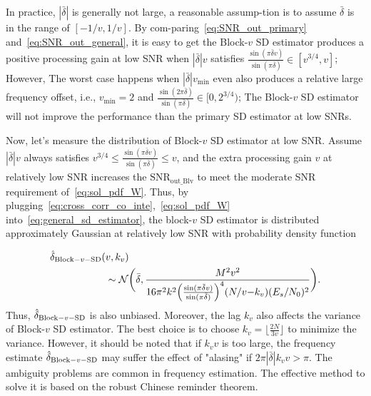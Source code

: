 In practice, $|\bar{\delta}|$ is generally not large,
a reasonable assump-tion is to assume $\bar{\delta}$ is in the range of $[-1/v,1/v]$.
By com-paring~\eqref{eq:SNR_out_primary} and~\eqref{eq:SNR_out_general}, it is easy to get
the Block-$v$ SD estimator produces a positive processing gain at low SNR when $|\bar{\delta}|v$ satisfies
$\frac{\sin(\pi \bar{\delta}v)}{\sin(\pi \bar{\delta})} \in [v^{3/4},v]$;
However, The worst case happens when $|\bar{\delta}|v_{\text{min}}$ even also produces a relative large frequency offset, 
i.e., $v_{\text{min}}=2$ and $\frac{\sin(2\pi \bar{\delta})}{\sin(\pi \bar{\delta})}\in [0,2^{3/4})$; 
The Block-$v$ SD estimator will not improve the performance than the primary SD estimator at low SNRs.

Now, let's measure the distribution of Block-$v$ SD estimator at low SNR.
Assume $|\bar{\delta}|v$ always satisfies $v^{3/4}\leq\frac{\sin(\pi \bar{\delta}v)}{\sin(\pi \bar{\delta})}\leq v$,
and the extra processing gain $v$ at relatively low SNR increases the $\text{SNR}_{\text{out\_Blv}}$ to meet the moderate SNR requirement of~\eqref{eq:sol_pdf_W}.
Thus, by plugging~\eqref{eq:cross_corr_co_inte},~\eqref{eq:sol_pdf_W} into~\eqref{eq:general_sd_estimator}, the block-$v$ SD estimator is distributed approximately Gaussian at relatively low SNR with probability density function

\begin{equation}
  \begin{aligned}
  \label{eq:pdf_general_delta}
      \hat{\delta}_{\text{Block}-v-\text{SD}}(&v,k_v) \\
      &\sim \mathcal{N} \bigg(\bar{\delta},\frac{M^2v^2}{16\pi^2k^2\Big(\frac{\sin(\pi \bar{\delta}v)}{\sin(\pi \bar{\delta})}\Big)^4(N/v{-}k_v)(E_s/N_0)^2}\bigg).
  \end{aligned}
\end{equation} 
Thus, $\hat{\delta}_{\text{Block}-v-\text{SD}}$ is also unbiased. Moreover, the lag $k_v$ also affects the variance of Block-$v$ SD estimator. The best choice is to choose
$k_v=\lfloor\frac{2N}{3v}\rfloor$ to minimize the variance. However,
it should be noted that if $k_vv$ is too large, 
the frequency estimate $\hat{\delta}_{\text{Block}-v-\text{SD}}$ 
may suffer the effect of "alasing" if $2\pi|\bar{\delta}|k_vv>\pi$.
The ambiguity problems are common in frequency estimation. The effective method to solve it is based on the robust Chinese reminder theorem.

